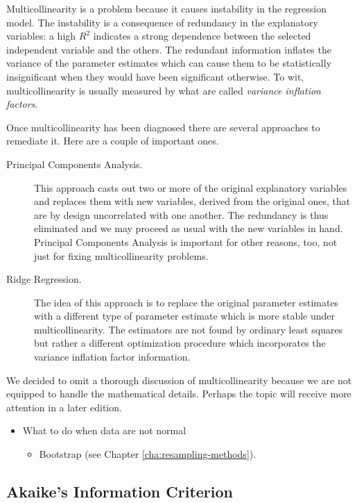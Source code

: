 \documentclass[captions=tableheading]{scrbook}
\begin{document}
Multicollinearity is a problem because it causes instability in the regression model. The instability is a consequence of redundancy in the explanatory variables: a high \(R^{2}\) indicates a strong dependence between the selected independent variable and the others. The redundant information inflates the variance of the parameter estimates which can cause them to be statistically insignificant when they would have been significant otherwise. To wit, multicollinearity is usually measured by what are called \emph{variance inflation factors}.

Once multicollinearity has been diagnosed there are several approaches to remediate it. Here are a couple of important ones. 
\begin{description}
\item[Principal Components Analysis.] This approach casts out two or more of the original explanatory variables and replaces them with new variables, derived from the original ones, that are by design uncorrelated with one another. The redundancy is thus eliminated and we may proceed as usual with the new variables in hand. Principal Components Analysis is important for other reasons, too, not just for fixing multicollinearity problems.
\item[Ridge Regression.] The idea of this approach is to replace the original parameter estimates with a different type of parameter estimate which is more stable under multicollinearity. The estimators are not found by ordinary least squares but rather a different optimization procedure which incorporates the variance inflation factor information.
\end{description}

We decided to omit a thorough discussion of multicollinearity because we are not equipped to handle the mathematical details. Perhaps the topic will receive more attention in a later edition.

\begin{itemize}
\item What to do when data are not normal
\begin{itemize}
\item Bootstrap (see Chapter \ref{cha:resampling-methods}).
\end{itemize}
\end{itemize}
\subsection{Akaike's Information Criterion}
\label{sec-7-9-4}
\end{document}
